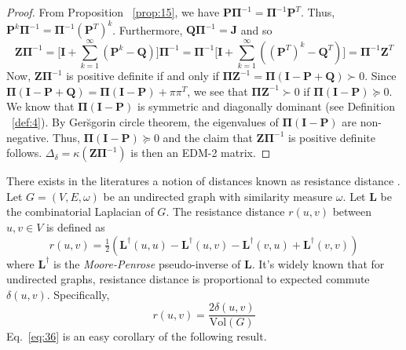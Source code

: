 \begin{proof}
  From Proposition ~\ref{prop:15}, we have $\mathbf{P}\bm{\Pi}^{-1} =
  \bm{\Pi}^{-1}\mathbf{P}^{T}$. Thus, $\mathbf{P}^{k}\bm{\Pi}^{-1} =
  \bm{\Pi}^{-1}(\mathbf{P}^{T})^{k}$. Furthermore, $\mathbf{Q}\bm{\Pi}^{-1} =
  \mathbf{J}$ and so
  \begin{equation}
    \label{eq:53}
    \mathbf{Z}\bm{\Pi}^{-1} = \biggl[\mathbf{I} +
    \sum_{k=1}^{\infty}(\mathbf{P}^{k} -
    \mathbf{Q})\biggr]\bm{\Pi}^{-1} =
    \bm{\Pi}^{-1}\biggl[\mathbf{I} +
    \sum_{k=1}^{\infty}((\mathbf{P}^{T})^{k} - \mathbf{Q}^{T})\biggr]
    = \bm{\Pi}^{-1}\mathbf{Z}^{T}
  \end{equation}
  Now, $\mathbf{Z}\bm{\Pi}^{-1}$ is positive definite if and only if
  $\bm{\Pi}\mathbf{Z}^{-1} = \bm{\Pi}(\mathbf{I} - \mathbf{P} +
  \mathbf{Q}) \succ 0$. Since $\bm{\Pi}(\mathbf{I} - \mathbf{P} +
  \mathbf{Q}) = \bm{\Pi}(\mathbf{I} - \mathbf{P}) + \pi\pi^{T}$, we
  see that $\bm{\Pi}\mathbf{Z}^{-1} \succ 0$ if $\bm{\Pi}(\mathbf{I} -
  \mathbf{P}) \succeq 0$. We know that $\bm{\Pi}(\mathbf{I} -
  \mathbf{P})$ is symmetric and diagonally dominant (see Definition
  ~\ref{def:4}). By Ger\u{s}gorin circle theorem, the eigenvalues of
  $\bm{\Pi}(\mathbf{I} - \mathbf{P})$ are non-negative. Thus,
  $\bm{\Pi}(\mathbf{I} - \mathbf{P}) \succeq 0$ and
  the claim that $\mathbf{Z}\bm{\Pi}^{-1}$ is positive definite
  follows. $\Delta_{\delta} = \kappa(\mathbf{Z}\bm{\Pi}^{-1})$ is then
  an EDM-2 matrix.
\end{proof}
%
There exists in the literatures a notion of distances known as
resistance distance
\citep{bapat99:_resis_distan_in_graph,klein93:_resis_distan}. Let $G =
(V,E,\omega)$ be an undirected graph with similarity measure
$\omega$. Let $\mathbf{L}$ be the combinatorial Laplacian of $G$. The
resistance distance $r(u,v)$ between $u, v \in V$ is defined as
\begin{equation}
  \label{eq:35}
  r(u,v) = \tfrac{1}{2}(\mathbf{L}^{\dagger}(u,u) - \mathbf{L}^{\dagger}(u,v) -
  \mathbf{L}^{\dagger}(v,u) + \mathbf{L}^{\dagger}(v,v))
\end{equation}
where $\mathbf{L}^{\dagger}$ is the {\em Moore-Penrose} \/pseudo-inverse of
$\mathbf{L}$. It's widely known that for undirected graphs, resistance
distance is proportional to expected commute
$\delta(u,v)$. Specifically,
\begin{equation}
  \label{eq:36}
  r(u,v) = \frac{2 \delta(u,v)}{\mathrm{Vol}(G)}
\end{equation}
Eq.~\eqref{eq:36} is an easy corollary of the following result.
